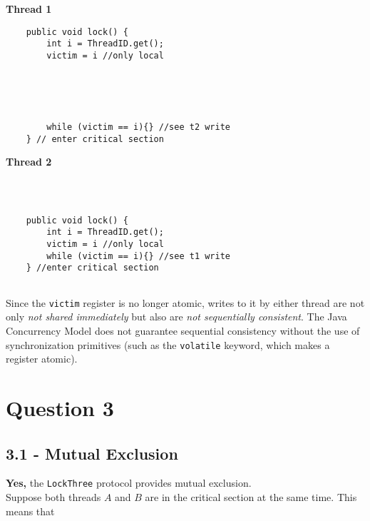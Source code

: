\documentclass[11pt, letterpaper]{article}
\newcommand{\code}[1] { \texttt{#1} }
\begin{document}
\begin{figure*}[h!]
    \begin{minipage}{0.5\textwidth}
        \centering
        \textbf{Thread 1}
        \begin{verbatim}
    public void lock() {
        int i = ThreadID.get();
        victim = i //only local





        while (victim == i){} //see t2 write
    } // enter critical section
        \end{verbatim}
    \end{minipage}
    \hspace{1cm}
    \begin{minipage}{0.5\textwidth}
        \centering
        \textbf{Thread 2}
        \begin{verbatim}



    public void lock() {
        int i = ThreadID.get();
        victim = i //only local
        while (victim == i){} //see t1 write
    } //enter critical section


            \end{verbatim}
    \end{minipage}
\end{figure*}

Since the \code{victim} register is no longer atomic, writes to it by either thread are not only \textit{not shared immediately} but also are \textit{not sequentially consistent}. The Java Concurrency Model does not guarantee sequential consistency without the use of synchronization primitives (such as the \code{volatile} keyword, which makes a register atomic).

\newpage
\section*{Question 3}
\label{sec:question_3}

\subsection*{3.1 - Mutual Exclusion}
\label{sub:3_1_mutual_exclusion}

\textbf{Yes,} the \code{LockThree} protocol provides mutual exclusion.\\

Suppose both threads $A$ and $B$ are in the critical section at the same time. This means that
\end{document}
